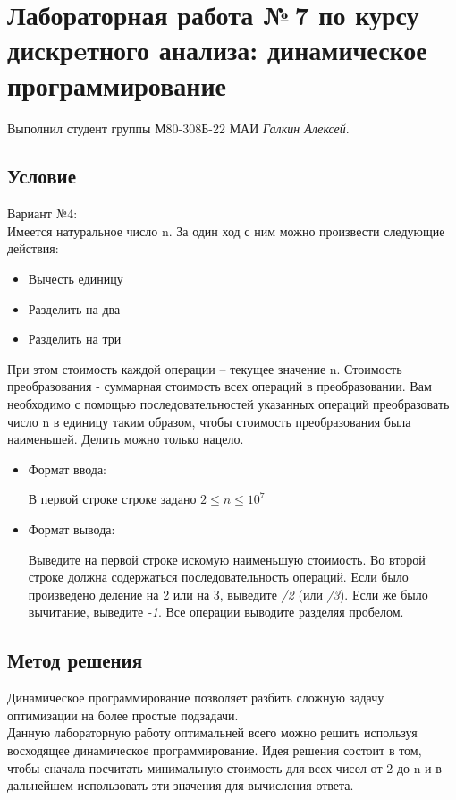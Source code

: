 \documentclass[12pt]{article}
\begin{document}
\section*{Лабораторная работа №\,7 по курсу дискрeтного анализа: динамическое программирование}

Выполнил студент группы М80-308Б-22 МАИ \textit{Галкин Алексей}.

\subsection*{Условие}
Вариант №4:\\
Имеется натуральное число n. За один ход с ним можно произвести следующие действия:
\begin{itemize}
\item
    Вычесть единицу
\item
    Разделить на два
\item
    Разделить на три
\end{itemize}
При этом стоимость каждой операции – текущее значение n. Стоимость преобразования - суммарная стоимость всех операций в преобразовании. Вам необходимо с помощью последовательностей указанных операций преобразовать число n в единицу таким образом, чтобы стоимость преобразования была наименьшей. Делить можно только нацело. 
\begin{itemize}
\item
    Формат ввода:
    
    В первой строке строке задано $2 \leq n \leq 10^{7}$

\item
    Формат вывода:
    
    Выведите на первой строке искомую наименьшую стоимость. Во второй строке должна содержаться последовательность операций. Если было произведено деление на 2 или на 3, выведите \textit{/2} (или \textit{/3}). Если же было вычитание, выведите \textit{-1}. Все операции выводите разделяя пробелом.
\end{itemize}

\subsection*{Метод решения}
Динамическое программирование позволяет разбить сложную задачу оптимизации на более простые подзадачи. \\
Данную лабораторную работу оптимальней всего можно решить используя восходящее динамическое программирование. Идея решения состоит в том, чтобы сначала посчитать минимальную стоимость для всех чисел от 2 до n и в дальнейшем использовать эти значения для вычисления ответа.
\end{document}

